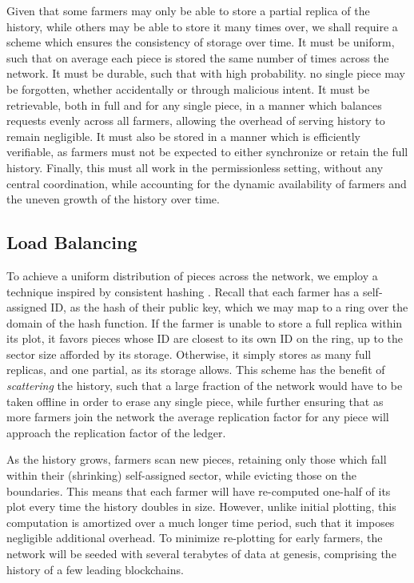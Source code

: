 \documentclass[conference]{IEEEtran}
\begin{document}
Given that some farmers may only be able to store a partial replica of the history, while others may be able to store it many times over, we shall require a scheme which ensures the consistency of storage over time. It must be uniform, such that on average each piece is stored the same number of times across the network. It must be durable, such that with high probability. no single piece may be forgotten, whether accidentally or through malicious intent. It must be retrievable, both in full and for any single piece, in a manner which balances requests evenly across all farmers, allowing the overhead of serving history to remain negligible. It must also be stored in a manner which is efficiently verifiable, as farmers must not be expected to either synchronize or retain the full history. Finally, this must all work in the permissionless setting, without any central coordination, while accounting for the dynamic availability of farmers and the uneven growth of the history over time. 

\subsection{Load Balancing}

To achieve a uniform distribution of pieces across the network, we employ a technique inspired by consistent hashing \cite{karger1997consistent}. Recall that each farmer has a self-assigned ID, as the hash of their public key, which we may map to a ring over the domain of the hash function. If the farmer is unable to store a full replica within its plot, it favors pieces whose ID are closest to its own ID on the ring, up to the sector size afforded by its storage. Otherwise, it simply stores as many full replicas, and one partial, as its storage allows. This scheme has the benefit of \textit{scattering} the history, such that a large fraction of the network would have to be taken offline in order to erase any single piece, while further ensuring that as more farmers join the network the average replication factor for any piece will approach the replication factor of the ledger. 

As the history grows, farmers scan new pieces, retaining only those which fall within their (shrinking) self-assigned sector, while evicting those on the boundaries. This means that each farmer will have re-computed one-half of its plot every time the history doubles in size. However, unlike initial plotting, this computation is amortized over a much longer time period, such that it imposes negligible additional overhead. To minimize re-plotting for early farmers, the network will be seeded with several terabytes of data at genesis, comprising the history of a few leading blockchains.
\end{document}
